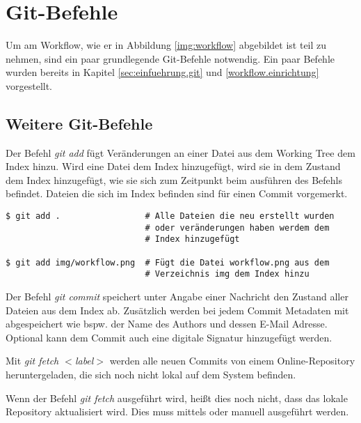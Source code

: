\section{Git-Befehle}
\label{git-commands}

Um am Workflow, wie er in Abbildung \ref{img:workflow} abgebildet ist teil zu nehmen, sind ein paar grundlegende Git-Befehle notwendig. Ein paar Befehle wurden bereits in Kapitel \ref{sec:einfuehrung.git} und \ref{workflow.einrichtung} vorgestellt.

\subsection{Weitere Git-Befehle}
\label{git-commands.advanced}

\label{git-commands.advanced.add}
Der Befehl \textit{git add} fügt Veränderungen an einer Datei aus dem Working Tree dem Index hinzu. Wird eine Datei dem Index hinzugefügt, wird sie in dem Zustand dem Index hinzugefügt, wie sie sich zum Zeitpunkt beim ausführen des Befehls befindet. Dateien die sich im Index befinden sind für einen Commit vorgemerkt. 

\begin{verbatim}
$ git add .                 # Alle Dateien die neu erstellt wurden 
                            # oder veränderungen haben werdem dem 
                            # Index hinzugefügt
                            
$ git add img/workflow.png  # Fügt die Datei workflow.png aus dem 
                            # Verzeichnis img dem Index hinzu
\end{verbatim}

\label{git-commands.advanced.commit}
Der Befehl \textit{git commit} speichert unter Angabe einer Nachricht den Zustand aller Dateien aus dem Index ab. Zusätzlich werden bei jedem Commit Metadaten mit abgespeichert wie bspw. der Name des Authors und dessen E-Mail Adresse. Optional kann dem Commit auch eine digitale Signatur hinzugefügt werden.

\label{git-commands.advanced.fetch}
Mit \textit{git fetch $ < $label$ > $} werden alle neuen Commits von einem Online-Repository heruntergeladen, die sich noch nicht lokal auf dem System befinden.

\begin{INFO}
  Wenn der Befehl \textit{git fetch} ausgeführt wird, heißt dies noch nicht, dass das lokale Repository aktualisiert wird. Dies muss mittels \textit{} oder \textit{} manuell ausgeführt werden.
\end{INFO}

